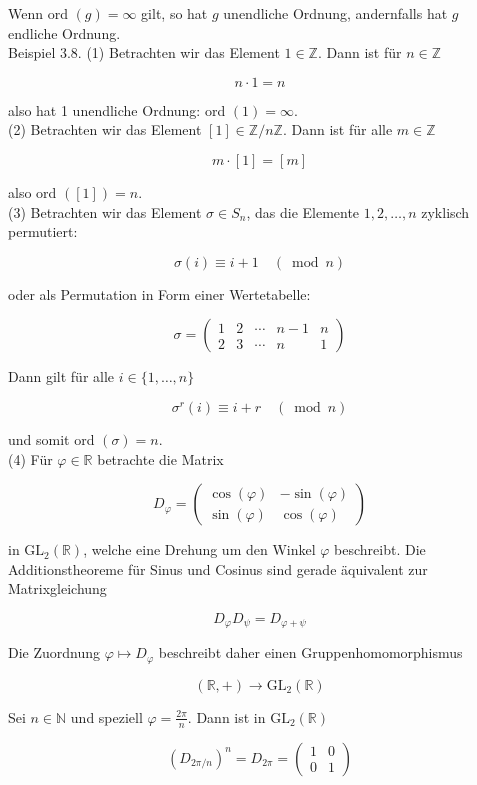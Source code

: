 \documentclass[10pt, letterpaper]{article}
\begin{document}
Wenn ord $(g)=\infty$ gilt, so hat $g$ unendliche Ordnung, andernfalls hat $g$ endliche Ordnung.\\
Beispiel 3.8. (1) Betrachten wir das Element $1 \in \mathbb{Z}$. Dann ist für $n \in \mathbb{Z}$

$$
n \cdot 1=n
$$

also hat 1 unendliche Ordnung: ord $(1)=\infty$.\\
(2) Betrachten wir das Element $[1] \in \mathbb{Z} / n \mathbb{Z}$. Dann ist für alle $m \in \mathbb{Z}$

$$
m \cdot[1]=[m]
$$

also ord $([1])=n$.\\
(3) Betrachten wir das Element $\sigma \in S_{n}$, das die Elemente $1,2, \ldots, n$ zyklisch permutiert:

$$
\sigma(i) \equiv i+1 \quad(\bmod n)
$$

oder als Permutation in Form einer Wertetabelle:

$$
\sigma=\left(\begin{array}{ccccc}
1 & 2 & \cdots & n-1 & n \\
2 & 3 & \cdots & n & 1
\end{array}\right)
$$

Dann gilt für alle $i \in\{1, \ldots, n\}$

$$
\sigma^{r}(i) \equiv i+r \quad(\bmod n)
$$

und somit ord $(\sigma)=n$.\\
(4) Für $\varphi \in \mathbb{R}$ betrachte die Matrix

$$
D_{\varphi}=\left(\begin{array}{rr}
\cos (\varphi) & -\sin (\varphi) \\
\sin (\varphi) & \cos (\varphi)
\end{array}\right)
$$

in $\mathrm{GL}_{2}(\mathbb{R})$, welche eine Drehung um den Winkel $\varphi$ beschreibt. Die Additionstheoreme für Sinus und Cosinus sind gerade äquivalent zur Matrixgleichung

$$
D_{\varphi} D_{\psi}=D_{\varphi+\psi}
$$

Die Zuordnung $\varphi \mapsto D_{\varphi}$ beschreibt daher einen Gruppenhomomorphismus

$$
(\mathbb{R},+) \rightarrow \mathrm{GL}_{2}(\mathbb{R})
$$

Sei $n \in \mathbb{N}$ und speziell $\varphi=\frac{2 \pi}{n}$. Dann ist in $\mathrm{GL}_{2}(\mathbb{R})$

$$
\left(D_{2 \pi / n}\right)^{n}=D_{2 \pi}=\left(\begin{array}{ll}
1 & 0 \\
0 & 1
\end{array}\right)
$$
\end{document}
